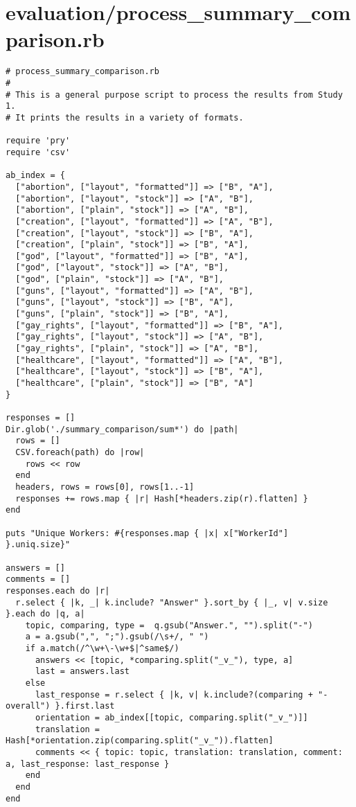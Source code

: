 \documentclass{article}
\begin{document}
\section*{evaluation/process\_summary\_comparison.rb}
\begin{verbatim}
# process_summary_comparison.rb
#
# This is a general purpose script to process the results from Study 1.
# It prints the results in a variety of formats.

require 'pry'
require 'csv'

ab_index = {
  ["abortion", ["layout", "formatted"]] => ["B", "A"],
  ["abortion", ["layout", "stock"]] => ["A", "B"],
  ["abortion", ["plain", "stock"]] => ["A", "B"],
  ["creation", ["layout", "formatted"]] => ["A", "B"],
  ["creation", ["layout", "stock"]] => ["B", "A"],
  ["creation", ["plain", "stock"]] => ["B", "A"],
  ["god", ["layout", "formatted"]] => ["B", "A"],
  ["god", ["layout", "stock"]] => ["A", "B"],
  ["god", ["plain", "stock"]] => ["A", "B"],
  ["guns", ["layout", "formatted"]] => ["A", "B"],
  ["guns", ["layout", "stock"]] => ["B", "A"],
  ["guns", ["plain", "stock"]] => ["B", "A"],
  ["gay_rights", ["layout", "formatted"]] => ["B", "A"],
  ["gay_rights", ["layout", "stock"]] => ["A", "B"],
  ["gay_rights", ["plain", "stock"]] => ["A", "B"],
  ["healthcare", ["layout", "formatted"]] => ["A", "B"],
  ["healthcare", ["layout", "stock"]] => ["B", "A"],
  ["healthcare", ["plain", "stock"]] => ["B", "A"]
}

responses = []
Dir.glob('./summary_comparison/sum*') do |path|
  rows = []
  CSV.foreach(path) do |row|
    rows << row
  end
  headers, rows = rows[0], rows[1..-1]
  responses += rows.map { |r| Hash[*headers.zip(r).flatten] }
end

puts "Unique Workers: #{responses.map { |x| x["WorkerId"] }.uniq.size}"

answers = []
comments = []
responses.each do |r|
  r.select { |k, _| k.include? "Answer" }.sort_by { |_, v| v.size }.each do |q, a|
    topic, comparing, type =  q.gsub("Answer.", "").split("-")
    a = a.gsub(",", ";").gsub(/\s+/, " ")
    if a.match(/^\w+\-\w+$|^same$/)
      answers << [topic, *comparing.split("_v_"), type, a]
      last = answers.last
    else
      last_response = r.select { |k, v| k.include?(comparing + "-overall") }.first.last
      orientation = ab_index[[topic, comparing.split("_v_")]]
      translation = Hash[*orientation.zip(comparing.split("_v_")).flatten]
      comments << { topic: topic, translation: translation, comment: a, last_response: last_response }
    end
  end
end


\end{verbatim}
\end{document}
